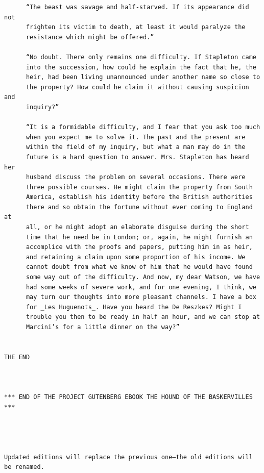 \documentclass{article}
\begin{document}
\begin{verbatim}
      “The beast was savage and half-starved. If its appearance did not
      frighten its victim to death, at least it would paralyze the
      resistance which might be offered.”

      “No doubt. There only remains one difficulty. If Stapleton came
      into the succession, how could he explain the fact that he, the
      heir, had been living unannounced under another name so close to
      the property? How could he claim it without causing suspicion and
      inquiry?”

      “It is a formidable difficulty, and I fear that you ask too much
      when you expect me to solve it. The past and the present are
      within the field of my inquiry, but what a man may do in the
      future is a hard question to answer. Mrs. Stapleton has heard her
      husband discuss the problem on several occasions. There were
      three possible courses. He might claim the property from South
      America, establish his identity before the British authorities
      there and so obtain the fortune without ever coming to England at
      all, or he might adopt an elaborate disguise during the short
      time that he need be in London; or, again, he might furnish an
      accomplice with the proofs and papers, putting him in as heir,
      and retaining a claim upon some proportion of his income. We
      cannot doubt from what we know of him that he would have found
      some way out of the difficulty. And now, my dear Watson, we have
      had some weeks of severe work, and for one evening, I think, we
      may turn our thoughts into more pleasant channels. I have a box
      for _Les Huguenots_. Have you heard the De Reszkes? Might I
      trouble you then to be ready in half an hour, and we can stop at
      Marcini’s for a little dinner on the way?”


THE END



*** END OF THE PROJECT GUTENBERG EBOOK THE HOUND OF THE BASKERVILLES ***




Updated editions will replace the previous one—the old editions will
be renamed.


\end{verbatim}
\end{document}
